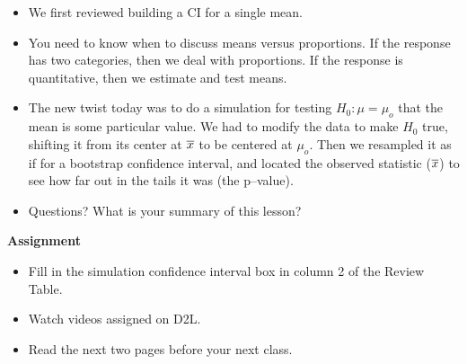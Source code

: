 \begin{itemize}
\item We first reviewed building a CI for a single mean.
\item You need to know when to discuss means versus proportions.  If
  the response has two categories, then we deal with proportions.  If
  the response is quantitative, then we estimate and test means.
\item The new twist today was to do a simulation for testing $H_0: \mu
  = \mu_o$ that the mean is some particular value.  We had to modify
  the data to make $H_0$ true, shifting it from its center at $\overline{x}$ to
  be centered at $\mu_o$.  Then we resampled it as if for a bootstrap
  confidence interval, and located the observed statistic ($\overline{x}$) to
  see how far out in the tails it was (the p--value).

 \item 
Questions? What is your summary of this  lesson? \vfill

\end{itemize}



\noindent
{\bf Assignment} \vspace{-.2in}
\begin{itemize}
\item Fill in the simulation confidence interval box in column 2 of
  the Review Table.
\item Watch videos assigned on D2L.
\item Read the next two pages before your next class.
\end{itemize}
